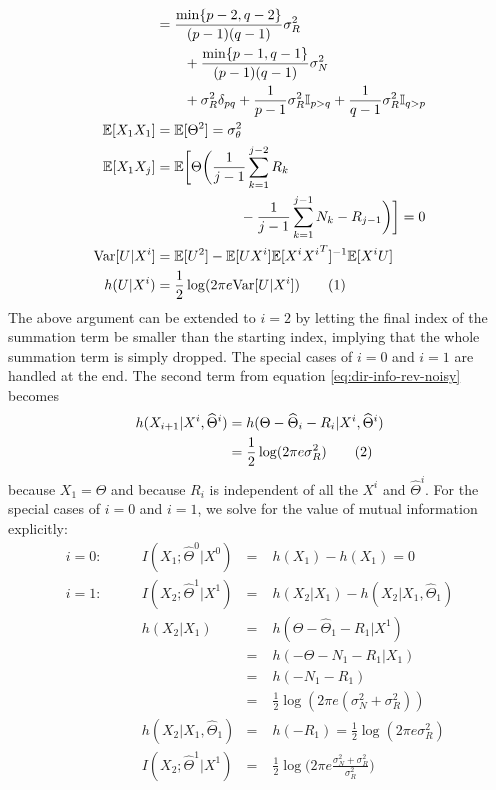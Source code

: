 \documentclass[letterpaper, 10pt, conference]{ieeeconf}
\newcommand\numberthis{\stepcounter{equation}\tag{\theequation}}
\begin{document}
\vspace{-12pt}
\begin{align*}
					    &= \frac{\min\{p-2, q-2\}}{(p-1)(q-1)} \sigma_R^2 \\
						& \qquad + \frac{\min\{p-1, q-1\}}{(p-1)(q-1)} \sigma_N^2 \\
						& \qquad + \sigma_R^2 \delta_{pq} + \frac{1}{p-1} \sigma_R^2 \mathbb{I}_{p>q} + \frac{1}{q-1} \sigma_R^2 \mathbb{I}_{q>p} \\
	\mathbb{E}[X_1 X_1] &= \mathbb{E}[\Theta^2] = \sigma_\theta^2 \\
	\mathbb{E}[X_1 X_j] &= \mathbb{E} \bigg[ \Theta \bigg( \frac{1}{j-1} \sum_{k=1}^{j-2} R_k \\
						& \qquad \qquad \qquad - \frac{1}{j-1} \sum_{k=1}^{j-1} N_k - R_{j-1} \bigg) \bigg] = 0 \\
	\text{Var}[U|X^i] &= \mathbb{E}[U^2] - \mathbb{E}[U X^i] \mathbb{E}[X^i {X^i}^T]^{-1} \mathbb{E}[X^i U] \\
	h(U | X^i) &= \frac{1}{2}\log(2 \pi e \text{Var}[U | X^i]) \numberthis \label{eq:h_x_x-noisy}
\end{align*}
The above argument can be extended to $i=2$ by letting the final index of the summation term be smaller than the starting index, implying that the whole summation term is simply dropped. The special cases of $i=0$ and $i=1$ are handled at the end. The second term from equation \eqref{eq:dir-info-rev-noisy} becomes
\begin{align*}
	h(X_{i+1} | X^i, \widehat\Theta^i) &= h(\Theta - \widehat\Theta_i - R_i | X^i, \widehat\Theta^i) \\
									   &= \frac{1}{2}\log(2 \pi e \sigma_R^2) \numberthis \label{eq:h_x_x_theta-noisy}
\end{align*}
because $X_1 = \Theta$ and because $R_i$ is independent of all the $X^i$ and $\widehat\Theta^i$. For the special cases of $i=0$ and $i=1$, we solve for the value of mutual information explicitly:
\begin{align*}
	i = 0: & \qquad I(X_1; \widehat\Theta^0 | X^0) &=& \; h(X_1) - h(X_1) = 0 \\
	i = 1: & \qquad I(X_2; \widehat\Theta^1 | X^1) &=& \; h(X_2 | X_1) - h(X_2 | X_1, \widehat\Theta_1) \\
		   & \qquad h(X_2 | X_1)                   &=& \; h(\Theta - \widehat\Theta_1 - R_1 | X^1) \\
		   & \qquad                                &=& \; h(-\Theta - N_1 - R_1 | X_1) \\
		   & \qquad                                &=& \; h(-N_1 - R_1) \\
		   & \qquad                                &=& \; \frac{1}{2} \log(2 \pi e (\sigma_N^2 + \sigma_R^2)) \\
		   & \qquad h(X_2 | X_1, \widehat\Theta_1) &=& \; h(-R_1) = \frac{1}{2} \log(2 \pi e \sigma_R^2) \\
		   & \qquad I(X_2; \widehat\Theta^1 | X^1) &=& \; \frac{1}{2} \log \bigg( 2 \pi e \frac{\sigma_N^2 + \sigma_R^2}{\sigma_R^2} \bigg)
\end{align*}
\end{document}
